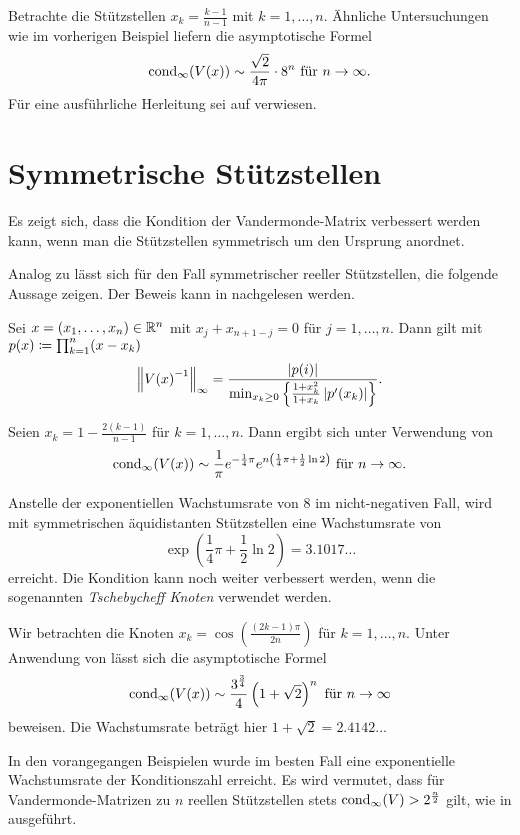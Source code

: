 \begin{example}
    Betrachte die Stützstellen $x_k = \frac{k-1}{n-1}$ mit $k=1, \dots, n$.
    Ähnliche Untersuchungen wie im vorherigen Beispiel liefern die
    asymptotische Formel
    \[
        \cond[\infty]{\Vand{x}} \sim \frac{\sqrt{2}}{4\pi} \cdot 8^n \text{ für } n \rightarrow \infty.
    \]
    Für eine ausführliche Herleitung sei auf \cite[S. 344f]{gautschi3}
    verwiesen.
\end{example}

\section{Symmetrische Stützstellen}
Es zeigt sich, dass die Kondition der Vandermonde-Matrix verbessert werden
kann, wenn man die Stützstellen symmetrisch um den Ursprung anordnet.

Analog zu  lässt sich für den Fall
symmetrischer reeller Stützstellen, die folgende Aussage zeigen.
Der Beweis kann in \cite[S. 341]{gautschi3} nachgelesen werden.
\begin{lemma}
    \label{lemma:symmetric_real_nodes}
    Sei $x = (x_1, \dots, x_n) \in \Rn$ mit $x_j + x_{n+1-j} = 0$ für $j = 1, \dots, n$.
    Dann gilt mit $p(x) \defeq \prod_{k=1}^{n} (x - x_k)$
    \[
        \norm{\Vand{x}^{-1}}_\infty = \frac{\abs{p(i)}}{\min_{x_k \geq 0} \left\{ \frac{1 + x_k^2}{1 + x_k} \abs{p^{\prime}(x_k)} \right\} }.
    \]
\end{lemma}

\begin{example}
    Seien $x_k = 1 - \frac{2(k-1)}{n-1}$ für ${k = 1, \dots, n}$.
    Dann ergibt sich unter Verwendung von 
    \[
        \cond[\infty]{\Vand{x}} \sim \frac{1}{\pi} e^{-\frac{1}{4} \pi} e^{n\left( \frac{1}{4} \pi + \frac{1}{2} \ln 2 \right)} \text{ für } n \rightarrow \infty.
    \]
\end{example}

Anstelle der exponentiellen Wachstumsrate von $8$ im nicht-negativen Fall, wird mit
symmetrischen äquidistanten Stützstellen eine Wachstumsrate von
\[
    \exp \left( \frac{1}{4} \pi + \frac{1}{2} \ln 2 \right) = 3.1017\dots
\]
erreicht.
Die Kondition kann noch weiter verbessert werden, wenn die sogenannten
\emph{Tschebycheff Knoten} verwendet werden.

\begin{example}
    Wir betrachten die Knoten $x_k = \cos \left( \frac{(2k-1) \pi}{2n} \right)$
    für $k=1, \dots, n$.
    Unter Anwendung von  lässt sich die
    asymptotische Formel
    \[
        \cond[\infty]{\Vand{x}} \sim \frac{3^{\frac{3}{4}}}{4} \left( 1 + \sqrt{2} \right)^n \text{ für } n \rightarrow \infty
    \]
    beweisen.
    Die Wachstumsrate beträgt hier $1 + \sqrt{2} = 2.4142..$.
\end{example}

In den vorangegangen Beispielen wurde im besten Fall eine exponentielle
Wachstumsrate der Konditionszahl erreicht.
Es wird vermutet, dass für
Vandermonde-Matrizen zu $n$ reellen Stützstellen stets
$\cond[\infty]{V} > 2^{\frac{n}{2}}$ gilt, wie in \cite[S. 199]{gautschi1}
ausgeführt.
